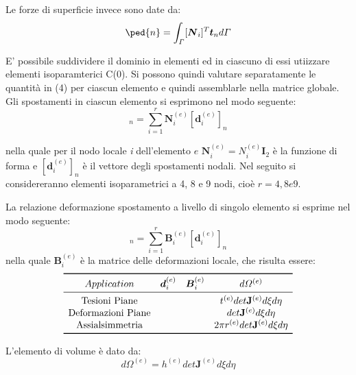 Le forze di superficie invece sono date da:
\begin{equation}
	[\boldsymbol{f}\ped{Ti}]\ped{n} = \int_\varGamma[\boldsymbol{N}_i]^T \boldsymbol{t}_n d\varGamma
\end{equation}

E' possibile suddividere il dominio in elementi ed in ciascuno di essi utiizzare elementi 
isoparamterici C(0). Si possono quindi valutare separatamente le quantità in (4) per ciascun 
elemento e quindi assemblarle nella matrice globale. Gli spostamenti in ciascun elemento 
si esprimono nel modo seguente:
\begin{equation}
	[u^{(e)}]_n= \sum_{i=1}^{r}\boldsymbol{N}_i^{(e)}[\boldsymbol{d}_i^{(e)}]_n
\end{equation}

nella quale per il nodo locale \textit{i} dell'elemento $\textit{e}$ $\boldsymbol{N}_i^{(e)}=N_i^{(e)}\boldsymbol{I}_2$ 
è la funzione di forma e $[\boldsymbol{d}_i^{(e)}]_n$ è il vettore degli spostamenti nodali. 
Nel seguito si considereranno elementi isoparametrici a 4, 8 e 9 nodi, cioè $\textit{r}=4,8 e 9$.

La relazione deformazione spostamento a livello di singolo elemento si esprime nel modo seguente:
\begin{equation}
	[\boldsymbol{\epsilon}^{(e)}]_n = \sum_{i=1}^r \boldsymbol{B}_i^{(e)}[\boldsymbol{d}_i^{(e)}]_n
\end{equation}
nella quale $\boldsymbol{B}_i^{(e)}$ è la matrice delle deformazioni locale, che risulta essere:
\[
\begin{array}{cccc}
	\toprule
	Application               & \boldsymbol{d}_i^{(e)}     & \boldsymbol{B}_i^{(e)}     & d\varOmega^{(e)}                             \\
	\midrule
	\text{Tesioni Piane}      &   &   & t^{(e)} det \mathbf{J}^{(e)} d\xi d\eta      \\
	\text{Deformazioni Piane} &   &   & det \mathbf{J}^{(e)} d\xi d\eta              \\
	\text{Assialsimmetria}    &   &   & 2\pi r^{(e)} det \mathbf{J}^{(e)} d\xi d\eta \\
	\bottomrule
\end{array}
\]

L'elemento di volume è dato da:
\begin{equation}
	d \Omega^{(e)} = h^{(e)} det \mathbf{J}^{(e)} d \xi d \eta
\end{equation}


